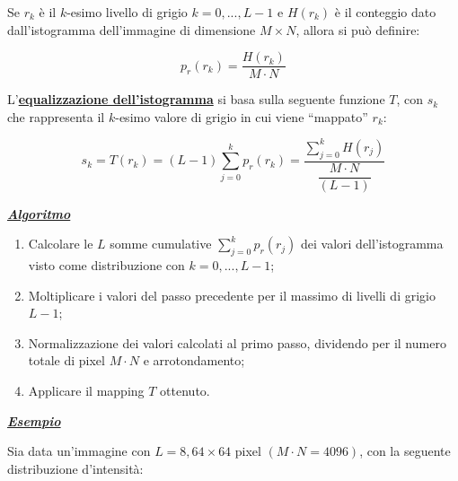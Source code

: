 \documentclass[a4paper]{article}
\newcommand{\dquotes}[1]{``#1''}
\begin{document}
	\noindent
	Se $r_{k}$ è il $k$-esimo livello di grigio $k = 0, ..., L - 1$ e $H\left(r_{k}\right)$ è il conteggio dato dall'istogramma dell'immagine di dimensione $M \times N$, allora si può definire:
	
	\begin{equation*}
		p_{r}\left(r_{k}\right) = \dfrac{H\left(r_{k}\right)}{M \cdot N}
	\end{equation*}

	\noindent
	L'\textcolor{Red3}{\textbf{\underline{equalizzazione dell'istogramma}}} si basa sulla seguente funzione $T$, con $s_{k}$ che rappresenta il $k$-esimo valore di grigio in cui viene \dquotes{mappato} $r_{k}$:
	
	\begin{equation*}
		s_{k} = T\left(r_{k}\right) = \left(L-1\right) \displaystyle\sum_{j=0}^{k} p_{r}\left(r_{k}\right) = \dfrac{\displaystyle\sum_{j=0}^{k} H\left(r_{j}\right)}{\dfrac{M \cdot N}{\left(L-1\right)}}
	\end{equation*}

	\noindent
	\textcolor{Red3}{\textbf{\emph{\underline{Algoritmo}}}}
	
	\begin{enumerate}[label=\Roman*.]
		\item Calcolare le $L$ somme cumulative $\displaystyle\sum_{j=0}^{k} p_{r}\left(r_{j}\right)$ dei valori dell'istogramma visto come distribuzione con $k = 0, ..., L-1$;
		
		\item Moltiplicare i valori del passo precedente per il massimo di livelli di grigio $L - 1$;
		
		\item Normalizzazione dei valori calcolati al primo passo, dividendo per il numero totale di pixel $M \cdot N$ e arrotondamento;
		
		\item Applicare il mapping $T$ ottenuto.
	\end{enumerate}

	\newpage
	
	\noindent
	\textcolor{Green4}{\textbf{\underline{\emph{Esempio}}}}\newline
	
	\noindent
	Sia data un'immagine con $L = 8, 64\times64$ pixel $\left(M \cdot N = 4096\right)$, con la seguente distribuzione d'intensità:
	
\end{document}
